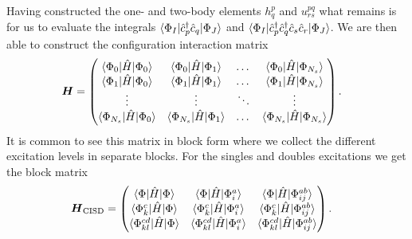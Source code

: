         Having constructed the one- and two-body elements $h^{p}_{q}$ and
        $u^{pq}_{rs}$ what remains is for us to evaluate the integrals
        $\langle \Phi_I |\hat{c}_{p}^{\dagger}\hat{c}_{q}| \Phi_J \rangle$ and
        $\langle \Phi_I |\hat{c}_{p}^{\dagger}\hat{c}_{q}^{\dagger}\hat{c}_{s}\hat{c}_{r}| \Phi_J \rangle$.
        We are then able to construct the configuration interaction matrix
        \begin{align}
            \boldsymbol{H}
            &=
            \begin{pmatrix}
                \langle \Phi_0 |\hat{H}| \Phi_0 \rangle &
                \langle \Phi_0 |\hat{H}| \Phi_1 \rangle &
                \dots &
                \langle \Phi_0 |\hat{H}| \Phi_{N_s} \rangle \\
                \langle \Phi_1 |\hat{H}| \Phi_0 \rangle &
                \langle \Phi_1 |\hat{H}| \Phi_1 \rangle &
                \dots &
                \langle \Phi_1 |\hat{H}| \Phi_{N_s} \rangle \\
                \vdots & \vdots & \ddots & \vdots \\
                \langle \Phi_{N_s} |\hat{H}| \Phi_0 \rangle &
                \langle \Phi_{N_s} |\hat{H}| \Phi_1 \rangle &
                \dots &
                \langle \Phi_{N_s} |\hat{H}| \Phi_{N_s} \rangle
            \end{pmatrix}.
        \end{align}
        It is common to see this matrix in block form where we collect
        the different excitation levels in separate blocks.
        For the singles and doubles excitations we get the block matrix
        \begin{align}
            \boldsymbol{H}_{\text{CISD}}
            &=
            \begin{pmatrix}
                \langle \Phi |\hat{H}| \Phi \rangle &
                \langle \Phi |\hat{H}| \Phi^{a}_{i} \rangle &
                \langle \Phi |\hat{H}| \Phi^{ab}_{ij} \rangle \\
                \langle \Phi^{c}_{k} |\hat{H}| \Phi \rangle &
                \langle \Phi^{c}_{k} |\hat{H}| \Phi^{a}_{i} \rangle &
                \langle \Phi^{c}_{k} |\hat{H}| \Phi^{ab}_{ij} \rangle \\
                \langle \Phi^{cd}_{kl} |\hat{H}| \Phi \rangle &
                \langle \Phi^{cd}_{kl} |\hat{H}| \Phi^{a}_{i} \rangle &
                \langle \Phi^{cd}_{kl} |\hat{H}| \Phi^{ab}_{ij} \rangle \\
            \end{pmatrix}.
        \end{align}

